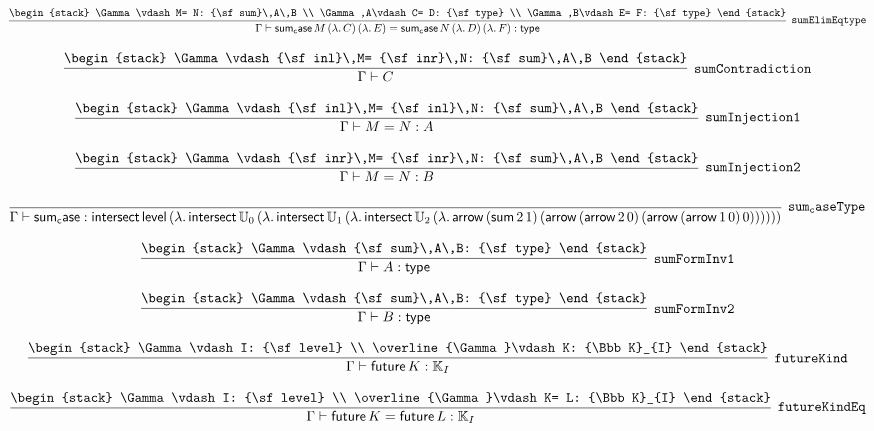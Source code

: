 \[
\infer[{\tt sumElimEqtype}]{\Gamma \vdash {\sf sum_case}\,M\,(\lambda .\,C)\,(\lambda .\,E)= {\sf sum_case}\,N\,(\lambda .\,D)\,(\lambda .\,F): {\sf type}}{
\begin{stack}
\Gamma \vdash M= N: {\sf sum}\,A\,B
\\
\Gamma ,A\vdash C= D: {\sf type}
\\
\Gamma ,B\vdash E= F: {\sf type}
\end{stack}}
\]

\[
\infer[{\tt sumContradiction}]{\Gamma \vdash C}{
\begin{stack}
\Gamma \vdash {\sf inl}\,M= {\sf inr}\,N: {\sf sum}\,A\,B
\end{stack}}
\]

\[
\infer[{\tt sumInjection1}]{\Gamma \vdash M= N: A}{
\begin{stack}
\Gamma \vdash {\sf inl}\,M= {\sf inl}\,N: {\sf sum}\,A\,B
\end{stack}}
\]

\[
\infer[{\tt sumInjection2}]{\Gamma \vdash M= N: B}{
\begin{stack}
\Gamma \vdash {\sf inr}\,M= {\sf inr}\,N: {\sf sum}\,A\,B
\end{stack}}
\]

\[
\infer[{\tt sum_caseType}]{\Gamma \vdash {\sf sum_case}: {\sf intersect}\,{\sf level}\,(\lambda .\,{\sf intersect}\,{\Bbb U}_{0}\,(\lambda .\,{\sf intersect}\,{\Bbb U}_{1}\,(\lambda .\,{\sf intersect}\,{\Bbb U}_{2}\,(\lambda .\,{\sf arrow}\,({\sf sum}\,2\,1)\,({\sf arrow}\,({\sf arrow}\,2\,0)\,({\sf arrow}\,({\sf arrow}\,1\,0)\,0))))))}{}
\]

\[
\infer[{\tt sumFormInv1}]{\Gamma \vdash A: {\sf type}}{
\begin{stack}
\Gamma \vdash {\sf sum}\,A\,B: {\sf type}
\end{stack}}
\]

\[
\infer[{\tt sumFormInv2}]{\Gamma \vdash B: {\sf type}}{
\begin{stack}
\Gamma \vdash {\sf sum}\,A\,B: {\sf type}
\end{stack}}
\]

\[
\infer[{\tt futureKind}]{\Gamma \vdash {\sf future}\,K: {\Bbb K}_{I}}{
\begin{stack}
\Gamma \vdash I: {\sf level}
\\
\overline{\Gamma}\vdash K: {\Bbb K}_{I}
\end{stack}}
\]

\[
\infer[{\tt futureKindEq}]{\Gamma \vdash {\sf future}\,K= {\sf future}\,L: {\Bbb K}_{I}}{
\begin{stack}
\Gamma \vdash I: {\sf level}
\\
\overline{\Gamma}\vdash K= L: {\Bbb K}_{I}
\end{stack}}
\]

